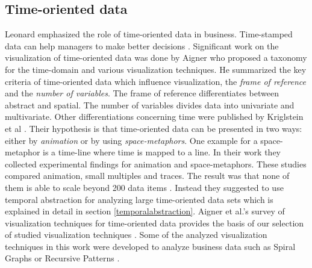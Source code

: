 \subsection{Time-oriented data}
Leonard emphasized the role of time-oriented data in business. Time-stamped data can help managers to make better decisions \cite{Leonard2005}. 
Significant work on the visualization of time-oriented data was done by Aigner \cite{Aigner2011,  Aigner2008,  Aigner2007} who proposed a taxonomy for the time-domain and various visualization techniques. He summarized the key criteria of time-oriented data which influence visualization, the \textit{frame of reference} and the \textit{number of variables}. The frame of reference differentiates between abstract and spatial. The number of variables divides data into univariate and multivariate. 
Other differentiations concerning time were published by Kriglstein et al \cite{Kriglstein2014}. Their hypothesis is that time-oriented data can be presented in two ways: either by \textit{animation} or by using \textit{space-metaphors}. One example for a space-metaphor is a time-line where time is mapped to a line. In their work they collected experimental findings for animation and space-metaphors. These studies compared animation,  small multiples and traces. The result was that none of them is able to scale beyond 200 data items  \cite{Robertson2013}. Instead they suggested to use temporal abstraction for analyzing large time-oriented data sets which is explained in detail in section \ref{temporalabstraction}.  Aigner et al.'s survey of visualization techniques for time-oriented data provides the basis of our selection of studied visualization techniques \cite{Aigner2011}. Some of the analyzed visualization techniques in this work were developed to analyze business data such as Spiral Graphs \cite{Weber2001} or Recursive Patterns \cite{Keim1995}. 
\par

